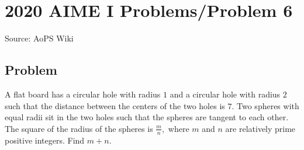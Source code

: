 \documentclass[12pt]{article}
\begin{document}
\section*{{2020 AIME I Problems/Problem 6}}
Source: AoPS Wiki

\subsection*{Problem}
A flat board has a circular hole with radius $1$ and a circular hole with radius $2$ such that the distance between the centers of the two holes is $7.$ Two spheres with equal radii sit in the two holes such that the spheres are tangent to each other. The square of the radius of the spheres is $\tfrac{m}{n},$ where $m$ and $n$ are relatively prime positive integers. Find $m+n.$
\end{document}
